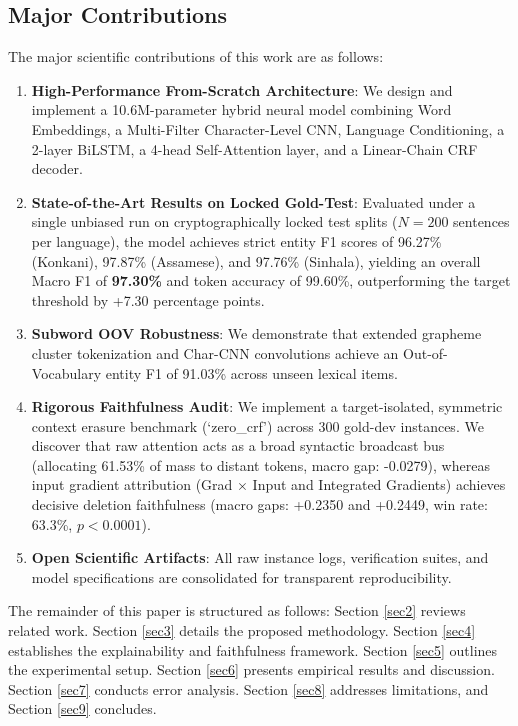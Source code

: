 \documentclass[default,iicol]{sn-jnl}
\begin{document}
\subsection{Major Contributions}
The major scientific contributions of this work are as follows:
\begin{enumerate}
    \item \textbf{High-Performance From-Scratch Architecture}: We design and implement a 10.6M-parameter hybrid neural model combining Word Embeddings, a Multi-Filter Character-Level CNN, Language Conditioning, a 2-layer BiLSTM, a 4-head Self-Attention layer, and a Linear-Chain CRF decoder.
    \item \textbf{State-of-the-Art Results on Locked Gold-Test}: Evaluated under a single unbiased run on cryptographically locked test splits ($N=200$ sentences per language), the model achieves strict entity F1 scores of 96.27\% (Konkani), 97.87\% (Assamese), and 97.76\% (Sinhala), yielding an overall Macro F1 of \textbf{97.30\%} and token accuracy of 99.60\%, outperforming the target threshold by +7.30 percentage points.
    \item \textbf{Subword OOV Robustness}: We demonstrate that extended grapheme cluster tokenization and Char-CNN convolutions achieve an Out-of-Vocabulary entity F1 of 91.03\% across unseen lexical items.
    \item \textbf{Rigorous Faithfulness Audit}: We implement a target-isolated, symmetric context erasure benchmark (`zero\_crf') across 300 gold-dev instances. We discover that raw attention acts as a broad syntactic broadcast bus (allocating 61.53\% of mass to distant tokens, macro gap: -0.0279), whereas input gradient attribution (Grad $\times$ Input and Integrated Gradients) achieves decisive deletion faithfulness (macro gaps: +0.2350 and +0.2449, win rate: 63.3\%, $p < 0.0001$).
    \item \textbf{Open Scientific Artifacts}: All raw instance logs, verification suites, and model specifications are consolidated for transparent reproducibility.
\end{enumerate}

The remainder of this paper is structured as follows: Section \ref{sec2} reviews related work. Section \ref{sec3} details the proposed methodology. Section \ref{sec4} establishes the explainability and faithfulness framework. Section \ref{sec5} outlines the experimental setup. Section \ref{sec6} presents empirical results and discussion. Section \ref{sec7} conducts error analysis. Section \ref{sec8} addresses limitations, and Section \ref{sec9} concludes.
\end{document}
